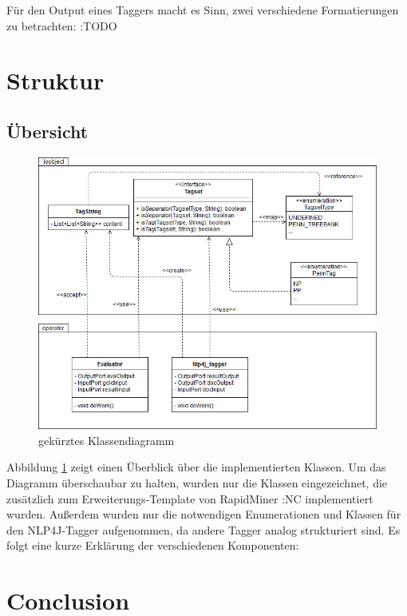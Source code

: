 Für den Output eines Taggers macht es Sinn, zwei verschiedene Formatierungen zu betrachten: :TODO

\section{Struktur}
\label{sec:impl:structure}

\subsection{Übersicht}
\label{sec:impl:structure:overview}

\begin{figure}[htb]
	\includegraphics[width=\textwidth]{gfx/UML_Overview_simple.jpg}
	\caption{gekürztes Klassendiagramm}
	\label{fig:impl:structure:overview:uml}
\end{figure}

Abbildung \ref{fig:impl:structure:overview:uml} zeigt einen Überblick über die implementierten Klassen. Um das Diagramm überschaubar zu halten, wurden nur die Klassen eingezeichnet, die zusätzlich zum Erweiterungs-Template von RapidMiner :NC implementiert wurden. Außerdem wurden nur die notwendigen Enumerationen und Klassen für den NLP4J-Tagger aufgenommen, da andere Tagger analog strukturiert sind. Es folgt eine kurze Erklärung der verschiedenen Komponenten:

\section{Conclusion}
\label{sec:system:conclusion}

